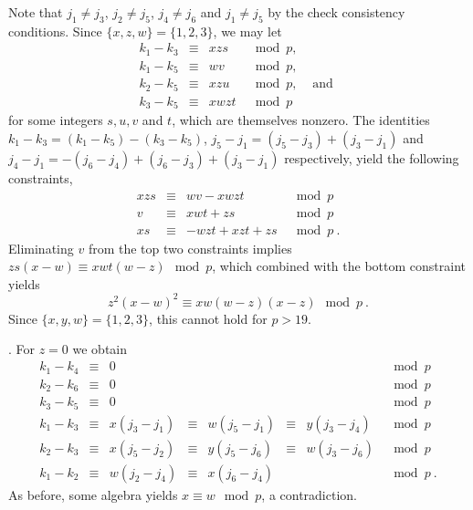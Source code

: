 Note that $j_1 \neq j_3$, $j_2 \neq j_5$, $j_4 \neq j_6$ and $j_1
\neq j_5$ by the check consistency conditions. Since
$\{x,z,w\}=\{1,2,3\}$, we may let
\begin{equation}\begin{array}{ccccc}k_1-k_3 &\equiv& xzs &\mod p, &{} \\
k_1-k_5 &\equiv & wv &\mod p, &{}\\ k_2-k_5 &\equiv& xzu &\mod p,
&\text{ and }\\k_3-k_5 &\equiv& xwzt &\mod p&{}
\end{array}\end{equation}
for some integers $s,u,v$ and $t$, which are themselves nonzero. The
identities $k_1-k_3=(k_1-k_5)-(k_3-k_5)$,
$j_5-j_1=(j_5-j_3)+(j_3-j_1)$ and
$j_4-j_1=-(j_6-j_4)+(j_6-j_3)+(j_3-j_1)$ respectively, yield the
following constraints,
\begin{equation}\begin{array}{cccc}
xzs &\equiv &wv-xwzt &\mod p \\
v &\equiv &xwt+zs &\mod p \\
xs & \equiv& -wzt +xzt+zs &\mod p~.
\end{array}\end{equation}
Eliminating $v$ from the top two constraints implies $zs(x-w)
\equiv xwt(w-z) \mod p$, which combined with the bottom constraint
yields
\begin{equation}
z^2(x-w)^2 \equiv xw(w-z)(x-z) \mod p~.
\end{equation}
Since $\{x,y,w\}=\{1,2,3\}$, this cannot hold for $p>19$.

. For $z=0$ we obtain
\begin{equation}\begin{array}{ccccccccc}
k_1-k_4 &\equiv& 0 & {}& {}&{}&{}&\mod p
\\
k_2-k_6 &\equiv& 0 & {}& {}&{}&{}&\mod p\\
k_3-k_5 &\equiv& 0 & {}& {}&{}&{}&\mod p\\
k_1-k_3 &\equiv& x(j_3-j_1)& \equiv& w(j_5-j_1)& \equiv&
y(j_3-j_4) &\mod p
\\
k_2-k_3 &\equiv& x(j_5-j_2) &\equiv&  y(j_5-j_6) &\equiv&
w(j_3-j_6) &\mod
p\\
k_1-k_2 &\equiv& w(j_2-j_4) &\equiv& x(j_6-j_4) & {}&{}&\mod p~.
\end{array}\end{equation}
As before, some algebra yields $x\equiv w \mod p$, a contradiction.


